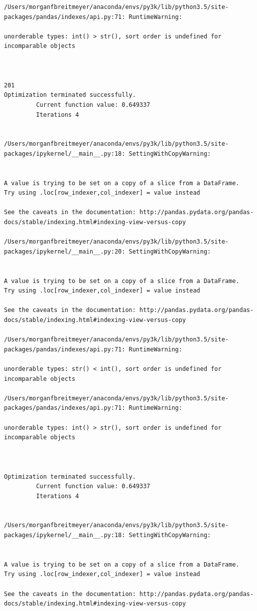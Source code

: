 \begin{lstlisting}
/Users/morganfbreitmeyer/anaconda/envs/py3k/lib/python3.5/site-packages/pandas/indexes/api.py:71: RuntimeWarning:

unorderable types: int() > str(), sort order is undefined for incomparable objects



201
Optimization terminated successfully.
         Current function value: 0.649337
         Iterations 4


/Users/morganfbreitmeyer/anaconda/envs/py3k/lib/python3.5/site-packages/ipykernel/__main__.py:18: SettingWithCopyWarning:


A value is trying to be set on a copy of a slice from a DataFrame.
Try using .loc[row_indexer,col_indexer] = value instead

See the caveats in the documentation: http://pandas.pydata.org/pandas-docs/stable/indexing.html#indexing-view-versus-copy

/Users/morganfbreitmeyer/anaconda/envs/py3k/lib/python3.5/site-packages/ipykernel/__main__.py:20: SettingWithCopyWarning:


A value is trying to be set on a copy of a slice from a DataFrame.
Try using .loc[row_indexer,col_indexer] = value instead

See the caveats in the documentation: http://pandas.pydata.org/pandas-docs/stable/indexing.html#indexing-view-versus-copy

/Users/morganfbreitmeyer/anaconda/envs/py3k/lib/python3.5/site-packages/pandas/indexes/api.py:71: RuntimeWarning:

unorderable types: str() < int(), sort order is undefined for incomparable objects

/Users/morganfbreitmeyer/anaconda/envs/py3k/lib/python3.5/site-packages/pandas/indexes/api.py:71: RuntimeWarning:

unorderable types: int() > str(), sort order is undefined for incomparable objects



Optimization terminated successfully.
         Current function value: 0.649337
         Iterations 4


/Users/morganfbreitmeyer/anaconda/envs/py3k/lib/python3.5/site-packages/ipykernel/__main__.py:18: SettingWithCopyWarning:


A value is trying to be set on a copy of a slice from a DataFrame.
Try using .loc[row_indexer,col_indexer] = value instead

See the caveats in the documentation: http://pandas.pydata.org/pandas-docs/stable/indexing.html#indexing-view-versus-copy


\end{lstlisting}
